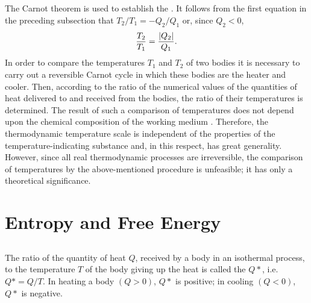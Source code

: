 \subsection{}\label{11.3.5} The Carnot theorem  is used to establish the . It follows from the first equation in the preceding subsection that $T_{2}/T_{1} = -Q_{2}/Q_{1}$ or, since $Q_{2} < 0$,
\begin{equation*}%
\frac{T_{2}}{T_{1}} = \frac{\abs{Q_{2}}}{Q_{1}}.
\end{equation*}
In order to compare the temperatures $T_{1}$ and $T_{2}$ of two bodies it is necessary to carry out a reversible Carnot cycle in which these bodies are the heater and cooler. Then, according to the ratio of the numerical values of the quantities of heat delivered to and received from the bodies, the ratio of their temperatures is determined. The result of such a comparison of temperatures does not depend upon the chemical composition of the working medium . Therefore, the thermodynamic temperature scale is independent of the properties of the temperature-indicating substance  and, in this respect, has great generali­ty. However, since all real thermodynamic processes are irre­versible, the comparison of temperatures by the above-men­tioned procedure is unfeasible; it has only a theoretical signi­ficance.

\section{Entropy and Free Energy}
\label{sec-11.4}

\subsection{}\label{11.4.1} The ratio of the quantity of heat $Q$, received by a body in an isothermal process, to the temperature $T$ of the body giving up the heat is called the  $Q*$, i.e. $Q* = Q/T$. In heating a body $(Q > 0)$, $Q*$ is positive; in cooling $(Q < 0)$, $Q*$ is negative.

